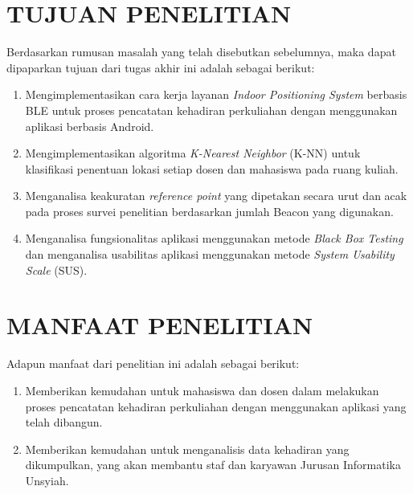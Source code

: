 \section{\uppercase{TUJUAN PENELITIAN}}
Berdasarkan rumusan masalah yang telah disebutkan sebelumnya, maka dapat dipaparkan tujuan dari tugas akhir ini adalah sebagai berikut:
\begin{enumerate}
	\item Mengimplementasikan cara kerja layanan \textit{Indoor Positioning System} berbasis BLE untuk proses pencatatan kehadiran perkuliahan dengan menggunakan aplikasi berbasis Android.
	\item Mengimplementasikan algoritma \textit{\textit{K-Nearest Neighbor}} (K-NN) untuk klasifikasi penentuan lokasi setiap dosen dan mahasiswa pada ruang kuliah. 
	\item Menganalisa keakuratan \textit{reference point} yang dipetakan secara urut dan acak pada proses survei penelitian berdasarkan jumlah Beacon yang digunakan.
	\item Menganalisa fungsionalitas aplikasi menggunakan metode \textit{Black Box Testing} dan menganalisa usabilitas aplikasi menggunakan metode \textit{System Usability Scale} (SUS).
\end{enumerate}


\section{\uppercase{MANFAAT PENELITIAN}}
Adapun manfaat dari penelitian ini adalah sebagai berikut:
\begin{enumerate}
	\item Memberikan kemudahan untuk mahasiswa dan dosen dalam melakukan proses pencatatan kehadiran perkuliahan dengan menggunakan aplikasi yang telah dibangun.
	\item Memberikan kemudahan untuk menganalisis data kehadiran yang dikumpulkan, yang akan membantu staf dan karyawan Jurusan Informatika Unsyiah.
	
\end{enumerate}


\begin{comment}

\end{comment}